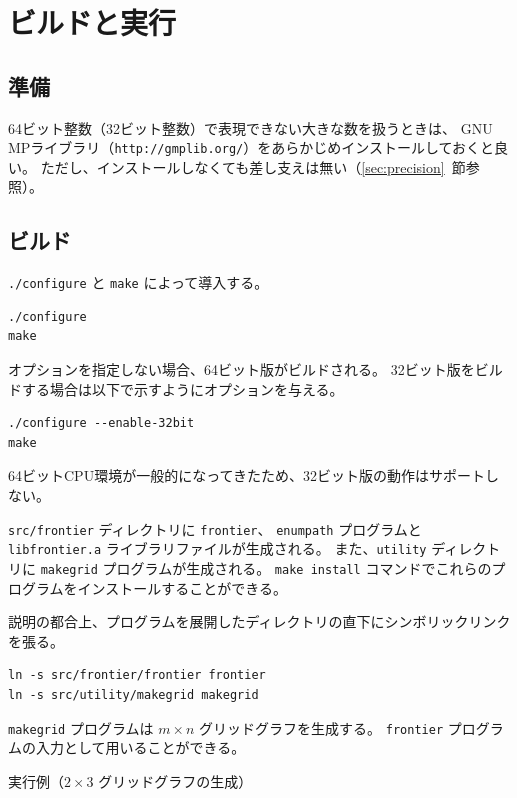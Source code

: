 \documentclass{jsarticle}
\begin{document}
\section{ビルドと実行}

\subsection{準備}

64ビット整数（32ビット整数）で表現できない大きな数を扱うときは、
GNU MPライブラリ（\texttt{http://gmplib.org/}）をあらかじめインストールしておくと良い。
ただし、インストールしなくても差し支えは無い（\ref{sec:precision}~節参照）。

\subsection{ビルド}

\texttt{./configure} と \texttt{make} によって導入する。

\begin{verbatim}
./configure
make
\end{verbatim}

オプションを指定しない場合、64ビット版がビルドされる。
32ビット版をビルドする場合は以下で示すようにオプションを与える。

\begin{verbatim}
./configure --enable-32bit
make
\end{verbatim}

64ビットCPU環境が一般的になってきたため、32ビット版の動作はサポートしない。

\texttt{src/frontier} ディレクトリに \texttt{frontier}、 \texttt{enumpath} プログラムと
\texttt{libfrontier.a} ライブラリファイルが生成される。
また、\texttt{utility} ディレクトリに \texttt{makegrid} プログラムが生成される。
\texttt{make install} コマンドでこれらのプログラムをインストールすることができる。

説明の都合上、プログラムを展開したディレクトリの直下にシンボリックリンクを張る。

\begin{verbatim}
ln -s src/frontier/frontier frontier
ln -s src/utility/makegrid makegrid
\end{verbatim}

\texttt{makegrid} プログラムは $m \times n$ グリッドグラフを生成する。
\texttt{frontier} プログラムの入力として用いることができる。

実行例（$2 \times 3$ グリッドグラフの生成）
\end{document}
